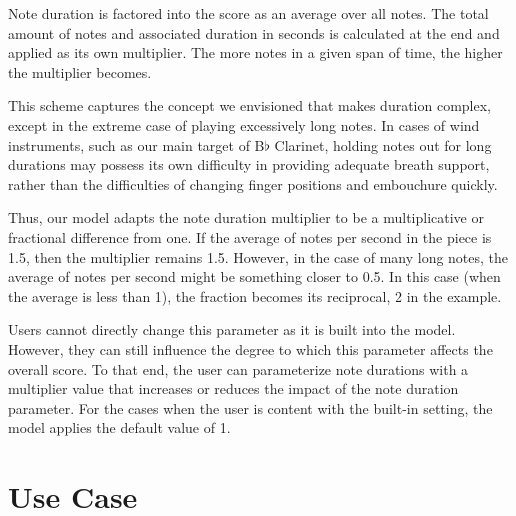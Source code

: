 \documentclass[10pt,preprint]{sigplanconf}
\begin{document}
Note duration is factored into the score as an average over all notes. The total amount of notes and associated duration in seconds is calculated at the end and applied as its own multiplier. The more notes in a given span of time, the higher the multiplier becomes.

This scheme captures the concept we envisioned that makes duration complex, except in the extreme case of playing excessively long notes. In cases of wind instruments, such as our main target of B$\flat$ Clarinet, holding notes out for long durations may possess its own difficulty in providing adequate breath support, rather than the difficulties of changing finger positions and embouchure quickly.

Thus, our model adapts the note duration multiplier to be a multiplicative or fractional difference from one. If the average of notes per second in the piece is 1.5, then the multiplier remains 1.5. However, in the case of many long notes, the average of notes per second might be something closer to 0.5. In this case (when the average is less than 1), the fraction becomes its reciprocal, 2 in the example.

Users cannot directly change this parameter as it is built into the model. However, they can still influence the degree to which this parameter affects the overall score. To that end, the user can parameterize note durations with a multiplier value that increases or reduces the impact of the note duration parameter. For the cases when the user is content with the built-in setting, the model applies the default value of 1.


\section{Use Case}
\label{sec:usecase}

\end{document}
